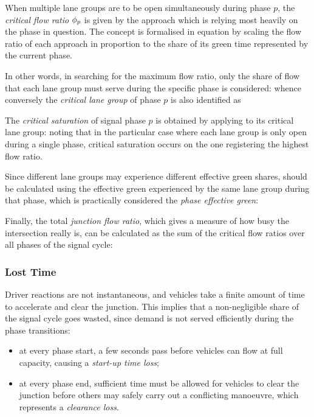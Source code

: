 When multiple lane groups are to be open simultaneously during phase $p$, the \emph{critical flow ratio} $\phi_p$ is given by the approach which is relying most heavily on the phase in question.
The concept is formalised in equation  by scaling the flow ratio of each approach in proportion to the share of its green time represented by the current phase.

In other words, in searching for the maximum flow ratio, only the share of flow that each lane group must serve during the specific phase is considered:
whence conversely the \emph{critical lane group} of phase $p$ is also identified as

The \emph{critical saturation} of signal phase $p$ is obtained by applying  to its critical lane group:
noting that in the particular case where each lane group is only open during a single phase, critical saturation occurs on the one registering the highest flow ratio.

Since different lane groups may experience different effective green shares, should be calculated using the effective green experienced by the same lane group during that phase, which is practically considered the \emph{phase effective green}:

Finally, the total \emph{junction flow ratio}, which gives a measure of how busy the intersection really is, can be calculated as the sum of the critical flow ratios over all phases of the signal cycle:


\subsubsection*{Lost Time}
Driver reactions are not instantaneous, and vehicles take a finite amount of time to
accelerate and clear the junction. This implies that a non-negligible share of the signal cycle goes wasted, since demand is not served efficiently during the phase transitions:
\begin{itemize}
\item at every phase start, a few seconds pass before vehicles can flow at full capacity, causing a \emph{start-up time loss};
\item at every phase end, sufficient time must be allowed for vehicles to clear the junction before others may safely carry out a conflicting manoeuvre, which represents a \emph{clearance loss}.
\end{itemize}

